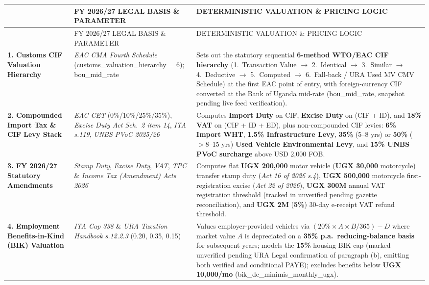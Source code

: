 \documentclass[10pt,a4paper]{article}
\newcommand{\code}[1]{{\datafont\fontsize{8.2}{9}\selectfont\textcolor{inkii}{#1}}}
\newcommand{\tbl}{\fontsize{7.8}{9.3}\selectfont}
\newcommand{\tblhead}[1]{{\labelfont\fontsize{6.4}{8}\selectfont
  \hyphenpenalty=10000\exhyphenpenalty=10000\textcolor{inkiii}{#1}}}
\begin{document}
\needspace{18mm}
\begingroup\tbl
\begin{longtable}{>{\RaggedRight\arraybackslash}p{36mm}>{\RaggedRight\arraybackslash}p{42mm}>{\RaggedRight\arraybackslash}p{61.6mm}}
\toprule
\tblhead{STATUTORY VALUATION DOMAIN} & \tblhead{FY 2026/27 LEGAL BASIS \& PARAMETER} & \tblhead{DETERMINISTIC VALUATION \& PRICING LOGIC} \\
\midrule\endfirsthead
\toprule
\tblhead{STATUTORY VALUATION DOMAIN} & \tblhead{FY 2026/27 LEGAL BASIS \& PARAMETER} & \tblhead{DETERMINISTIC VALUATION \& PRICING LOGIC} \\
\midrule\endhead
\bottomrule\endfoot
\bottomrule\endlastfoot
\textbf{1. Customs CIF Valuation Hierarchy} & \emph{EAC CMA Fourth Schedule} (\code{customs\_valuation\_hierarchy = 6}); \code{bou\_mid\_rate} & Sets out the statutory sequential \textbf{6-method WTO/EAC CIF hierarchy} (1.\ Transaction Value \ensuremath{\rightarrow} 2.\ Identical \ensuremath{\rightarrow} 3.\ Similar \ensuremath{\rightarrow} 4.\ Deductive \ensuremath{\rightarrow} 5.\ Computed \ensuremath{\rightarrow} 6.\ Fall-back / URA Used MV CMV Schedule) at the first EAC point of entry, with foreign-currency CIF converted at the Bank of Uganda mid-rate (\code{bou\_mid\_rate}, snapshot pending live feed verification). \\
\addlinespace[0.4mm]
\textbf{2. Compounded Import Tax \& CIF Levy Stack} & \emph{EAC CET} (\code{0\%/10\%/25\%/35\%}), \emph{Excise Duty Act Sch.\ 2 item 14}, \emph{ITA s.119}, \emph{UNBS PVoC 2025/26} & Computes \textbf{Import Duty} on CIF, \textbf{Excise Duty} on \code{(CIF + ID)}, and \textbf{18\% VAT} on \code{(CIF + ID + ED)}, plus non-compounded CIF levies: \textbf{6\% Import WHT}, \textbf{1.5\% Infrastructure Levy}, \textbf{35\%} (5--8 yrs) or \textbf{50\%} ($>8$--15 yrs) \textbf{Used Vehicle Environmental Levy}, and \textbf{15\% UNBS PVoC surcharge} above USD 2,000 FOB. \\
\addlinespace[0.4mm]
\textbf{3. FY 2026/27 Statutory Amendments} & \emph{Stamp Duty}, \emph{Excise Duty}, \emph{VAT}, \emph{TPC} \& \emph{Income Tax (Amendment) Acts 2026} & Computes flat \textbf{UGX 200,000} motor vehicle (\textbf{UGX 30,000} motorcycle) transfer stamp duty (\emph{Act 16 of 2026 s.4}), \textbf{UGX 500,000} motorcycle first-registration excise (\emph{Act 22 of 2026}), \textbf{UGX 300M} annual VAT registration threshold (tracked in \code{unverified} pending gazette reconciliation), and \textbf{UGX 2M} (\textbf{5\%}) 30-day e-receipt VAT refund threshold. \\
\addlinespace[0.4mm]
\textbf{4. Employment Benefits-in-Kind (BIK) Valuation} & \emph{ITA Cap 338} \& \emph{URA Taxation Handbook s.12.2.3} (\code{0.20}, \code{0.35}, \code{0.15}) & Values employer-provided vehicles via $(20\% \times A \times B / 365) - D$ where market value $A$ is depreciated on a \textbf{35\% p.a.\ reducing-balance basis} for subsequent years; models the \textbf{15\%} housing BIK cap (marked \code{unverified} pending URA Legal confirmation of paragraph \code{(b)}, emitting both verified and conditional PAYE); excludes benefits below \textbf{UGX 10,000/mo} (\code{bik\_de\_minimis\_monthly\_ugx}). \\
\end{longtable}\endgroup
\end{document}
